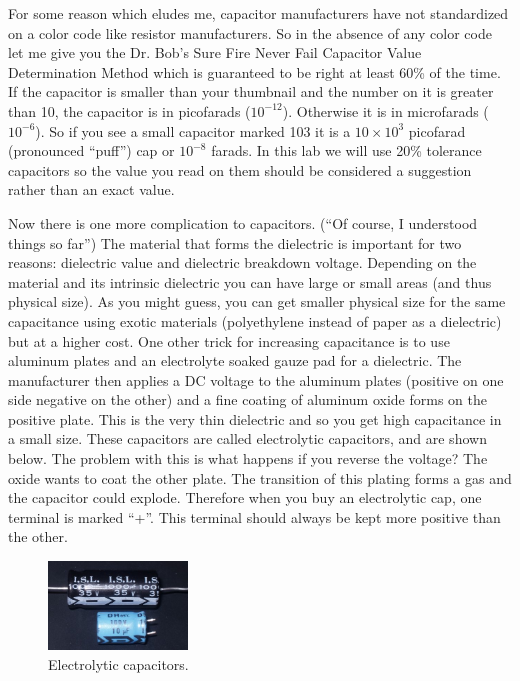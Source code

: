 \documentclass[12pt]{article}
\begin{document}
\begin{enumerate}[1.]
\par For some reason which eludes me, capacitor manufacturers have not standardized on a color code like resistor
manufacturers. 
So in the absence of any color code let me give you the Dr. Bob's Sure Fire Never Fail Capacitor Value Determination Method which is guaranteed to be
right at least 60\% of the time. 
If the capacitor is smaller than your thumbnail and the number on it is greater than 10, the capacitor is in picofarads ($10^{-12}$). 
Otherwise it is in microfarads ($10^{-6}$).
So if you see a small capacitor marked 103 it is a $10\times10^3$ picofarad (pronounced ``puff'') cap or $10^{-8}$ farads. 
In this lab we will use 20\% tolerance capacitors so the value you read on them should be considered a suggestion rather than an exact value.

\par Now there is one more complication to capacitors. (``Of course, I understood things so far'') 
The material that forms the dielectric is important for two reasons: dielectric value and dielectric breakdown voltage. 
Depending on the material and its intrinsic dielectric you can have large or small areas (and thus physical size). 
As you might guess, you can get smaller physical size for the same capacitance using exotic materials (polyethylene instead of paper as a dielectric) but at a higher cost. 
One other trick for increasing capacitance is to use aluminum plates and an electrolyte soaked gauze pad for a dielectric. 
The manufacturer then applies a DC voltage to the aluminum plates (positive on one side negative on the other) and a fine coating of aluminum oxide forms on the positive plate. 
This is the very thin dielectric and so you get high capacitance in a small size. 
These capacitors are called electrolytic capacitors, and are shown below. 
The problem with this is what happens if you reverse the voltage? 
The oxide wants to coat the other plate. 
The transition of this plating forms a gas and the capacitor could explode. 
Therefore when you buy an electrolytic cap, one terminal is marked ``+''. 
This terminal should always be kept more positive than the other.

\begin{figure}[!ht]
\begin{center}
\includegraphics[width=0.33\textwidth,trim=0 0 0 0,clip=false]{ec.png}
\caption*{Electrolytic capacitors.}
\end{center}
\end{figure}


\end{enumerate}
\end{document}
